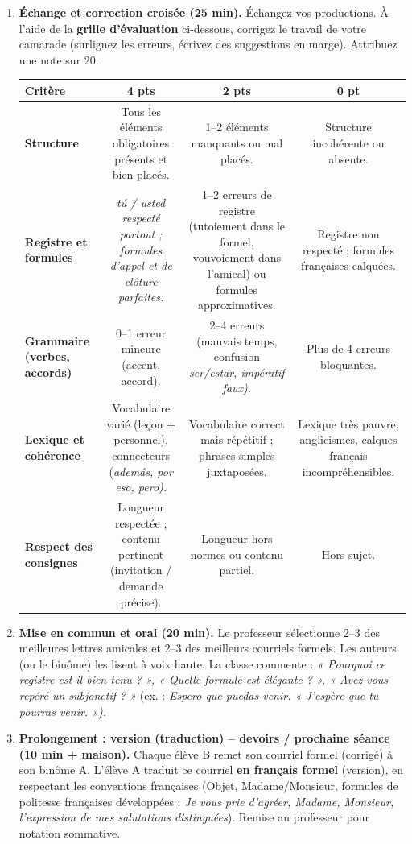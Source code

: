 \documentclass[11pt]{article}
\newcommand{\esp}[1]{\ifmmode\text{\textit{#1}}\else\begingroup\selectlanguage{spanish}\itshape #1\endgroup\fi}
\begin{document}
\begin{enumerate}
    \item \textbf{Échange et correction croisée (25 min).}
    Échangez vos productions. À l'aide de la \textbf{grille d'évaluation} ci-dessous, corrigez le travail de votre camarade (surlignez les erreurs, écrivez des suggestions en marge). Attribuez une note sur 20.

    \begin{center}
    \begin{tabularx}{\linewidth}{|X|c|c|c|}\hline
    \rowcolor{popblueL} \textbf{Critère} & \textbf{4 pts} & \textbf{2 pts} & \textbf{0 pt} \\ \hline
    \textbf{Structure} & Tous les éléments obligatoires présents et bien placés. & 1--2 éléments manquants ou mal placés. & Structure incohérente ou absente. \\ \hline
    \textbf{Registre et formules} & \esp{tú / usted} respecté partout ; formules d'appel et de clôture parfaites. & 1--2 erreurs de registre (tutoiement dans le formel, vouvoiement dans l'amical) ou formules approximatives. & Registre non respecté ; formules françaises calquées. \\ \hline
    \textbf{Grammaire (verbes, accords)} & 0--1 erreur mineure (accent, accord). & 2--4 erreurs (mauvais temps, confusion \esp{ser/estar}, impératif faux). & Plus de 4 erreurs bloquantes. \\ \hline
    \textbf{Lexique et cohérence} & Vocabulaire varié (leçon + personnel), connecteurs (\esp{además, por eso, pero}). & Vocabulaire correct mais répétitif ; phrases simples juxtaposées. & Lexique très pauvre, anglicismes, calques français incompréhensibles. \\ \hline
    \textbf{Respect des consignes} & Longueur respectée ; contenu pertinent (invitation / demande précise). & Longueur hors normes ou contenu partiel. & Hors sujet. \\ \hline
    \end{tabularx}
    \end{center}

    \item \textbf{Mise en commun et oral (20 min).}
    Le professeur sélectionne 2--3 des meilleures lettres amicales et 2--3 des meilleurs courriels formels. Les auteurs (ou le binôme) les lisent à voix haute. La classe commente : \emph{« Pourquoi ce registre est-il bien tenu ? », « Quelle formule est élégante ? », « Avez-vous repéré un subjonctif ? »} (ex. : \esp{Espero que puedas venir.} « J'espère que tu pourras venir. »).

    \item \textbf{Prolongement : version (traduction) -- devoirs / prochaine séance (10 min + maison).}
    Chaque élève B remet son courriel formel (corrigé) à son binôme A. L'élève A traduit ce courriel \textbf{en français formel} (version), en respectant les conventions françaises (Objet, Madame/Monsieur, formules de politesse françaises développées : \emph{Je vous prie d'agréer, Madame, Monsieur, l'expression de mes salutations distinguées}). Remise au professeur pour notation sommative.
\end{enumerate}
\end{document}
